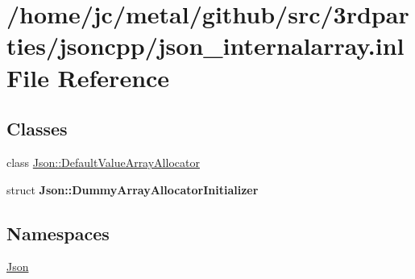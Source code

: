 \hypertarget{json__internalarray_8inl}{}\section{/home/jc/metal/github/src/3rdparties/jsoncpp/json\+\_\+internalarray.inl File Reference}
\label{json__internalarray_8inl}
\subsection*{Classes}
\begin{DoxyCompactItemize}
\item 
class \hyperlink{classJson_1_1DefaultValueArrayAllocator}{Json\+::\+Default\+Value\+Array\+Allocator}
\item 
struct {\bfseries Json\+::\+Dummy\+Array\+Allocator\+Initializer}
\end{DoxyCompactItemize}
\subsection*{Namespaces}
\begin{DoxyCompactItemize}
\item 
 \hyperlink{namespaceJson}{Json}
\end{DoxyCompactItemize}
